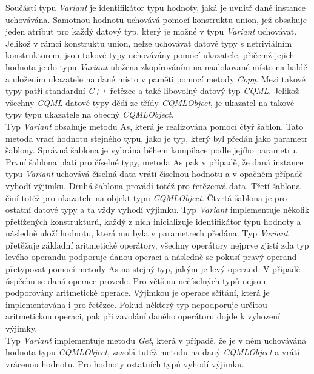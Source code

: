 \documentclass[11pt,twoside,a4paper]{book}
\begin{document}
{{\begin{ttemize}
{{\begin{lastlisting}[frame=single,caption=Řešení v pseudokódu problematického použití operátoru "." v přiřazovacím výroku,label=lst:var0N]
Součástí typu \textit{Variant} je identifikátor typu hodnoty, jaká je uvnitř dané instance uchovávána. Samotnou hodnotu uchovává pomocí konstruktu union, jež obsahuje jeden atribut pro každý datový typ, který je možné v typu \textit{Variant} uchovávat. Jelikož v rámci konstruktu union, nelze uchovávat datové typy s netriviálním konstruktorem, jsou takové typy uchovávány pomocí ukazatele, přičemž jejich hodnota je do typu \textit{Variant} uložena zkopírováním na naalokované místo na haldě a uložením ukazatele na dané místo v paměti pomocí metody \textit{Copy}. Mezi takové typy patří standardní \textit{C++} řetězec a také libovolný datový typ \textit{CQML}. Jelikož všechny \textit{CQML} datové typy dědí ze třídy \textit{CQMLObject}, je ukazatel na takové typy typu ukazatele na obecný \textit{CQMLObject}.\\
Typ \textit{Variant} obsahuje metodu As, která je realizována pomocí čtyř šablon. Tato metoda vrací hodnotu stejného typu, jako je typ, který byl předán jako parametr šablony. Správná šablona je vybrána během kompilace podle jejího parametru. První šablona platí pro číselné typy, metoda As pak v případě, že daná instance typu \textit{Variant} uchovává číselná data vrátí číselnou hodnotu a v opačném případě vyhodí výjimku. Druhá šablona provádí totéž pro řetězcová data. Třetí šablona činí totéž pro ukazatele na objekt typu \textit{CQMLObject}. Čtvrtá šablona je pro ostatní datové typy a ta vždy vyhodí výjimku.
Typ \textit{Variant} implementuje několik přetížených konstrukturů, každý z nich inicializuje identifikátor typu hodnoty a následně uloží hodnotu, která mu byla v parametrech předána.
Typ \textit{Variant} přetěžuje základní aritmetické operátory, všechny operátory nejprve zjistí zda typ levého operandu podporuje danou operaci a následně se pokusí pravý operand přetypovat pomocí metody As na stejný typ, jakým je levý operand. V případě úspěchu se daná operace provede. Pro většinu nečíselných typů nejsou podporovány aritmetické operace. Výjimkou je operace sčítání, která je implementována i pro řetězce. Pokud některý typ nepodporuje určitou aritmetickou operaci, pak při zavolání daného operátoru dojde k vyhození výjimky.\\
Typ \textit{Variant} implementuje metodu \textit{Get}, která v případě, že je v něm uchovávána hodnota typu \textit{CQMLObject}, zavolá tutéž metodu na daný \textit{CQMLObject} a vrátí vrácenou hodnotu. Pro hodnoty ostatních typů vyhodí výjimku.


\end{lastlisting}}}
\end{ttemize}}}
\end{document}
